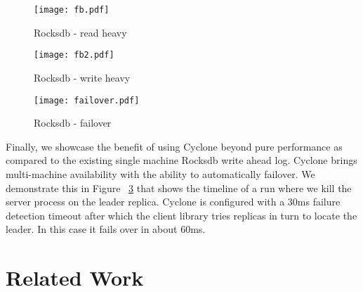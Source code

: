 \documentclass[twocolumn]{article}
\begin{document}
\begin{figure}
\texttt{[image: fb.pdf]}
\caption{Rocksdb - read heavy}
\label{fig:fb}
\end{figure}
\begin{figure}
  \texttt{[image: fb2.pdf]}
  \caption{Rocksdb - write heavy}
  \label{fig:fb2}
\end{figure}
\begin{figure}
  \texttt{[image: failover.pdf]}
  \caption{Rocksdb - failover}
  \label{fig:timeline}
\end{figure}

Finally, we showcase the benefit of using Cyclone beyond pure performance as
compared to the existing single machine Rocksdb write ahead log. Cyclone brings
multi-machine availability with the ability to automatically failover. We
demonstrate this in Figure ~\ref{fig:timeline} that shows the timeline of a run
where we kill the server process on the leader replica. Cyclone is configured 
with a 30ms failure detection timeout after which the client library tries
replicas in turn to locate the leader. In this case it fails over in about
60ms.

\section{Related Work}
\end{document}
